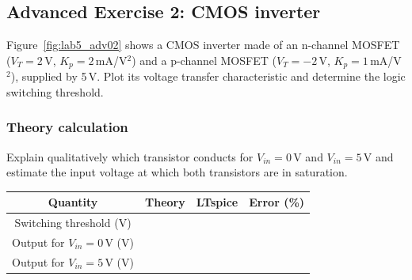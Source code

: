 \subsection{Advanced Exercise 2: CMOS inverter}
Figure~\ref{fig:lab5_adv02} shows a CMOS inverter made of an n-channel MOSFET ($V_T=2$\,V, $K_p=2$\,mA/V$^2$) and a p-channel MOSFET ($V_T=-2$\,V, $K_p=1$\,mA/V$^2$), supplied by 5\,V. Plot its voltage transfer characteristic and determine the logic switching threshold.


\subsubsection{Theory calculation}\vspace{-3pt}\notesblock Explain qualitatively which transistor conducts for $V_{in}=0$\,V and $V_{in}=5$\,V and estimate the input voltage at which both transistors are in saturation.

\begin{center}\renewcommand{\arraystretch}{1.8}\begin{tabular}{|c|c|c|c|}\hline \textbf{Quantity} & \textbf{Theory} & \textbf{LTspice} & \textbf{Error (\%)}\\ \hline Switching threshold (V) & & & \\ \hline Output for $V_{in}=0$\,V (V) & & & \\ \hline Output for $V_{in}=5$\,V (V) & & & \\ \hline \end{tabular}\end{center}
\newpage
